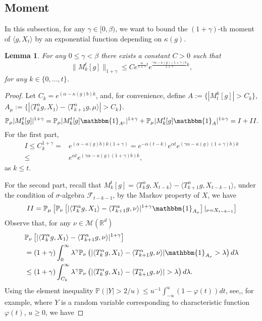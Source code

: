 \documentclass{article}
\newtheorem{lemma}{Lemma}[section]
\begin{document}
\subsection{Moment}

 In this subsection, for any $\gamma \in [0,\beta)$, we want to bound the $(1+\gamma)$-th moment of $\langle g ,X_t \rangle $ by an exponential function depending on $\kappa(g)$.
\begin{lemma}\label{lemma23}
For any $0\leq \gamma < \beta$ there exists a constant $C>0$ such that
$$\|M_k^t[g]\|_{1+\gamma}\leq C e^{\frac{\alpha}{1+\gamma}t}e^{\frac{\gamma \alpha-\kappa(g)(1+\gamma)b}{1+\gamma}k},$$
for any $k \in \{0,...,t\}$.
\end{lemma}

\begin{proof}
    Let $C_k=e^{(\alpha-\kappa(g)b)k}$, and, for convenience, define $A:=\{|M_t^k[g]|>C_k\}$, $A_{\mu}:=\{|\langle T_k^{\alpha}g, X_1\rangle-\langle T_{k+1}^{\alpha}g,\mu\rangle|>C_k\}$.
$$\mathbb{P}_{\mu}|M_k^t[g]|^{1+\gamma}=\mathbb{P}_{\mu}|M_k^t[g]\mathbbm{1}_{A^c}|^{1+\gamma}+\mathbb{P}_{\mu}|M_k^t[g]\mathbbm{1}_{A}|^{1+\gamma}=I+II.$$
For the first part,
\begin{align*}
    I\leq C_k^{1+\gamma}=&e^{(\alpha-\kappa(g)b)k(1+\gamma)}=e^{-\alpha(t-k)}e^{\alpha t}e^{(\gamma \alpha-\kappa(g)(1+\gamma)b)k}\\
    \leq &e^{\alpha t}e^{(\gamma \alpha-\kappa(g)(1+\gamma)b)k},
\end{align*}
as $k\leq t$.

For the second part, recall that $M_k^t[g]=\langle T_k^{\alpha}g, X_{t-k}\rangle-\langle T_{k+1}^{\alpha}g,X_{t-k-1}\rangle$,
under the condition of $\sigma$-algebra $\mathcal{F}_{t-k-1}$, by the Markov property of $X$, we have
\begin{align*}
    II=\mathbb{P}_{\mu}\left[\mathbb{P}_{\nu}\left[|\langle T_k^{\alpha}g, X_1\rangle-\langle T_{k+1}^{\alpha}g,\nu\rangle|^{1+\gamma}\mathbbm{1}_{A_{\nu}}\right]|_{\nu=X_{t-k-1}}\right]
\end{align*}
Observe that, for any $\nu \in \mathcal{M}(\mathbb{R}^d)$
\begin{align}
    &\mathbb{P}_{\nu}\left[|\langle T_k^{\alpha}g, X_1\rangle-\langle T_{k+1}^{\alpha}g,\nu\rangle|^{1+\gamma}\right] \label{temp1}\\ 
    &=(1+\gamma)\int_0^{\infty}\lambda^{\gamma}\mathbb{P}_{\nu}\left(|\langle T_k^{\alpha}g, X_1\rangle-\langle T_{k+1}^{\alpha}g,\nu\rangle|\mathbbm{1}_{A_{\nu}}>\lambda\right)d\lambda \nonumber\\
    &\leq (1+\gamma)\int_{C_{k}}^{\infty}\lambda^{\gamma}\mathbb{P}_{\nu}\left(|\langle T_k^{\alpha}g, X_1\rangle-\langle T_{k+1}^{\alpha}g,\nu\rangle|>\lambda\right)d\lambda.\nonumber
\end{align}
Using the element inequality $\mathbb{P}(|Y|>2/u)\leq u^{-1}\int_{-u}^{u}(1-\varphi(t))dt$, see,\cite[Chaper 3]{DR}, for example, where $Y$ is a random variable corresponding to characteristic function $\varphi(t)$, $u\geq 0$, we have


\end{proof}
\end{document}
